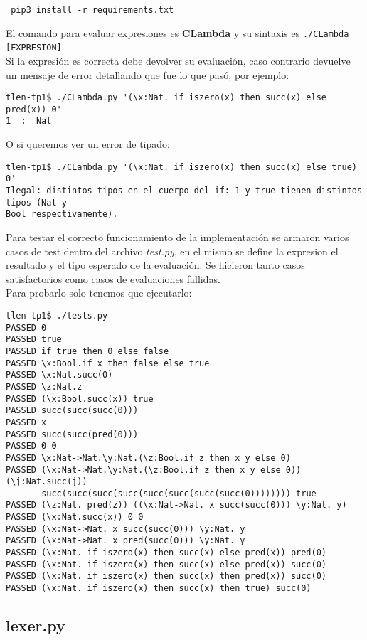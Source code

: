 \documentclass[spanish, a4paper]{article}
\begin{document}
\verb| pip3 install -r requirements.txt |

El comando para evaluar expresiones es \textbf{CLambda} y su sintaxis es \verb|./CLambda [EXPRESION]|.\\
Si la expresión es correcta debe devolver su evaluación, caso contrario devuelve un mensaje de error detallando que fue lo que pasó, por ejemplo:

\begin{verbatim}
tlen-tp1$ ./CLambda.py '(\x:Nat. if iszero(x) then succ(x) else pred(x)) 0'
1  :  Nat
\end{verbatim}

O si queremos ver un error de tipado:

\begin{verbatim}
tlen-tp1$ ./CLambda.py '(\x:Nat. if iszero(x) then succ(x) else true) 0'
Ilegal: distintos tipos en el cuerpo del if: 1 y true tienen distintos tipos (Nat y 
Bool respectivamente).
\end{verbatim}

Para testar el correcto funcionamiento de la implementación se armaron varios casos de test dentro del archivo \textit{test.py}, en el mismo se define la expresion el resultado y el tipo esperado de la evaluación. Se hicieron tanto casos satisfactorios como casos de evaluaciones fallidas.\\
Para probarlo solo tenemos que ejecutarlo:


\begin{verbatim}
tlen-tp1$ ./tests.py 
PASSED 0
PASSED true
PASSED if true then 0 else false
PASSED \x:Bool.if x then false else true
PASSED \x:Nat.succ(0)
PASSED \z:Nat.z
PASSED (\x:Bool.succ(x)) true
PASSED succ(succ(succ(0)))
PASSED x
PASSED succ(succ(pred(0)))
PASSED 0 0
PASSED \x:Nat->Nat.\y:Nat.(\z:Bool.if z then x y else 0)
PASSED (\x:Nat->Nat.\y:Nat.(\z:Bool.if z then x y else 0)) (\j:Nat.succ(j))
       succ(succ(succ(succ(succ(succ(succ(succ(0)))))))) true
PASSED (\z:Nat. pred(z)) ((\x:Nat->Nat. x succ(succ(0))) \y:Nat. y)
PASSED (\x:Nat.succ(x)) 0 0
PASSED (\x:Nat->Nat. x succ(succ(0))) \y:Nat. y
PASSED (\x:Nat->Nat. x pred(succ(0))) \y:Nat. y
PASSED (\x:Nat. if iszero(x) then succ(x) else pred(x)) pred(0)
PASSED (\x:Nat. if iszero(x) then succ(x) else pred(x)) succ(0)
PASSED (\x:Nat. if iszero(x) then succ(x) then pred(x)) succ(0)
PASSED (\x:Nat. if iszero(x) then succ(x) then true) succ(0)
\end{verbatim}

\newpage
\subsection{lexer.py}
      
\newpage
\end{document}
